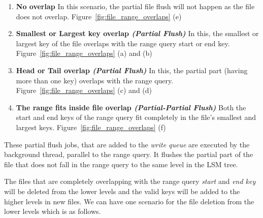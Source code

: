 \begin{enumerate}[leftmargin=*,labelindent=0mm, itemsep=0.2\baselineskip]
    \item \textbf{No overlap} In this scenario, the partial file flush will not happen as the file does not overlap. 
    Figure~\ref{fig:file_range_overlaps} (e)
    \item \textbf{Smallest or Largest key overlap \textit{(Partial Flush)}} In this, the smallest or largest key of the 
    file overlaps with the range query start or end key. Figure~\ref{fig:file_range_overlaps} (a) and (b)
    \item \textbf{Head or Tail overlap \textit{(Partial Flush)}} In this, the partial part (having more than one key) 
    overlaps with the range query. Figure~\ref{fig:file_range_overlaps} (c) and (d)
    \item \textbf{The range fits inside file overlap \textit{(Partial-Partial Flush)}} Both the start and end keys of 
    the range query fit completely in the file's smallest and largest keys. Figure~\ref{fig:file_range_overlaps} (f)
\end{enumerate}

These partial flush jobs, that are added to the \textit{write queue} are executed by the background thread, 
parallel to the range query. It flushes the partial part of the file that does not fall in the range query to the same 
level in the LSM tree.

The files that are completely overlapping with the range query \textit{start} and \textit{end key} will be deleted from the lower 
levels and the valid keys will be added to the higher levels in new files. We can have one scenario for the file 
deletion from the lower levels which is as follows.

